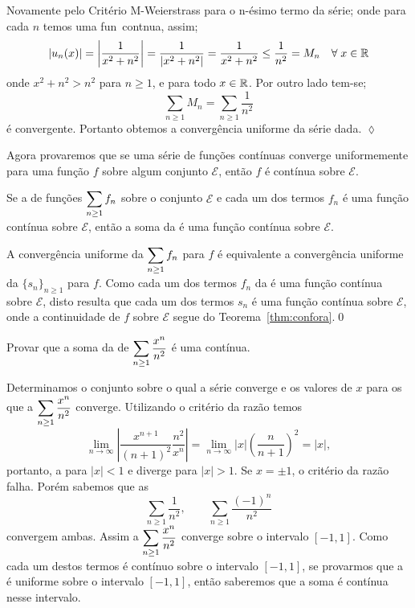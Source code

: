 \solo Novamente pelo Critério M-Weierstrass para o n-\'esimo termo
da s\'erie; onde para cada $n$ temos uma fun\cao\ cont\ii nua,
assim;
\begin{equation*}
|u_n(x)|=\left|\frac{1}{x^2+n^2}\right|=\frac{1}{|x^2+n^2|}=\frac{1}{x^2+n^2}\leq
\frac{1}{n^2}=M_n \quad \forall\; x\in \mathbb{R}
\end{equation*}
 onde $x^2+n^2>n^2$ para $n\geq 1$, e para todo $x\in\mathbb{R}$. Por outro lado tem-se;
$$
\sum_{n\geq 1} M_n=\sum_{n\geq 1}\frac{1}{n^2}
$$
\'e convergente. Portanto obtemos a convergência uniforme da s\'erie dada. 
\hfill \(\lozenge\)


Agora provaremos que se uma série de funções contínuas converge uniformemente para uma função $f$ 
sobre algum conjunto $\mathcal{E}$, então $f$ é contínua sobre $\mathcal{E}$.

\begin{theoc}{}{}
Se a \sers de funções $\displaystyle{\sum_{n\ge 1}f_n}$ \conve \unif sobre o conjunto $\mathcal{E}$ e cada um dos 
termos $f_n$ é uma função contínua sobre $\mathcal{E}$, então a soma da \ser é uma função contínua 
sobre $\mathcal{E}$.
\end{theoc}

\prova A convergência uniforme da $\displaystyle{\sum_{n\ge 1}f_n}$ para $f$ é equivalente a convergência 
uniforme da \seq $\{s_n\}_{n\ge 1}$ para $f$. Como cada um dos termos $f_n$ da \ser é uma função contínua
sobre $\mathcal{E}$, disto resulta que cada um dos termos $s_n$ é uma função contínua
sobre $\mathcal{E}$, onde a continuidade de $f$ sobre $\mathcal{E}$ segue do Teorema~\ref{thm:confora}.\qed

\begin{exer}
Provar que a soma da \ser de \funs $\displaystyle{\sum_{n\ge 1}\frac{x^n}{n^2}}$ é uma \fun contínua.
\end{exer}

\solo Determinamos o conjunto sobre o qual a série converge e os
valores de $x$ para os que a \ser $\displaystyle{\sum_{n\ge
1}\frac{x^n}{n^2}}$ converge. Utilizando o critério da razão temos
\begin{equation*}
    \lim_{n\to \infty}\left|\frac{x^{n+1}}{(n+1)^2}\frac{n^2}{x^n}
    \right|=\lim_{n\to\infty}|x|\left(\frac{n}{n+1}\right)^2=|x|,
\end{equation*}
portanto, a \ser  \conve para $|x|<1$ e diverge para $|x|>1$. Se
$x=\pm 1$, o critério da razão falha. Porém sabemos que as \sers
\begin{equation*}
\sum_{n\ge 1}\frac{1}{n^2}, \qquad \sum_{n\ge 1}\frac{(-1)^n}{n^2}
\end{equation*}
convergem ambas. Assim a \ser $\displaystyle{\sum_{n\ge 1}\frac{x^n}{n^2}}$
converge sobre o intervalo $[-1,1]$. Como cada um destos termos é
contínuo sobre o intervalo $[-1,1]$, se provarmos que a \conv é
uniforme sobre o intervalo $[-1,1]$, então saberemos que a soma é
contínua nesse intervalo.

